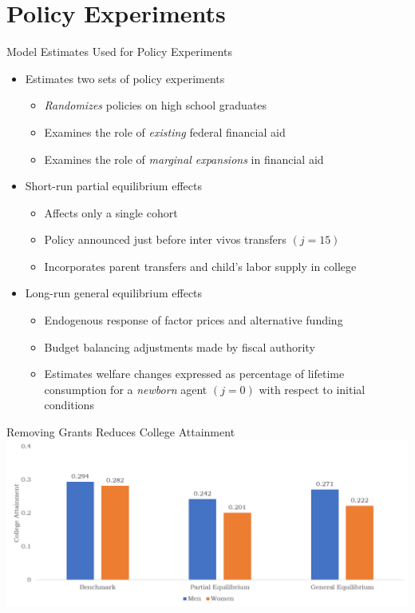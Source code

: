 \documentclass{beamer}
\begin{document}


\section{Policy Experiments}

\begin{frame}{Model Estimates Used for Policy Experiments}
\begin{itemize}
  \item Estimates two sets of policy experiments
    \begin{itemize}
    \item \textit{Randomizes} policies on high school graduates
      \item Examines the role of \textit{existing} federal financial aid
      \item Examines the role of \textit{marginal expansions} in financial aid \\[5mm]
    \end{itemize}
   \item Short-run partial equilibrium effects
   \begin{itemize}
  		\item Affects only a single cohort
        \item Policy announced just before inter vivos transfers $(j = 15)$
        \item Incorporates parent transfers and child's labor supply in college \\[5mm]
	\end{itemize}
	\item Long-run general equilibrium effects
   \begin{itemize}
  		\item Endogenous response of factor prices and alternative funding
        \item Budget balancing adjustments made by fiscal authority
        \item Estimates welfare changes expressed as percentage of lifetime consumption for a \textit{newborn} agent $(j = 0)$ with respect to initial conditions     
	\end{itemize}
\end{itemize}
\end{frame}

\begin{frame}{Removing Grants Reduces College Attainment}
\includegraphics[width=\textwidth]{grantsattain.png}
\end{frame}
\end{document}
